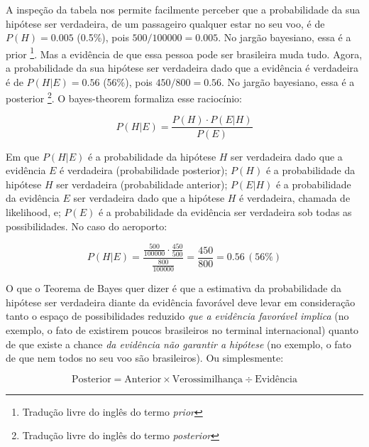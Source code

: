 \documentclass[./main.tex]{subfiles}
\begin{document}
A inspeção da tabela nos permite facilmente perceber que a probabilidade da sua hipótese ser verdadeira, de um passageiro qualquer estar no seu voo, é de $P(H) = 0.005$ (0.5\%), pois $500 / 100000 = 0.005$. No jargão bayesiano, essa é a \gls{prior} \footnote{Tradução livre do inglês do termo \textit{prior}}. Mas a evidência de que essa pessoa pode ser brasileira muda tudo. Agora, a probabilidade da sua hipótese ser verdadeira dado que a evidência é verdadeira é de $P(H | E) = 0.56$ (56\%), pois $450 / 800 = 0.56$. No jargão bayesiano, essa é a \gls{posterior} \footnote{Tradução livre do inglês do termo \textit{posterior}}. O \gls{bayes-theorem} formaliza esse raciocínio:
\begin{linenomath*}
\begin{equation}
\label{eq:bayes}
    P(H | E) = \frac{P(H) \cdot P(E | H)}{P(E)}
\end{equation}
\end{linenomath*}
Em que $P(H | E)$ é a probabilidade da hipótese $H$ ser verdadeira dado que a evidência $E$ é verdadeira (probabilidade posterior); $P(H)$ é a probabilidade da hipótese $H$ ser verdadeira (probabilidade anterior);  $P(E | H)$ é a probabilidade da evidência $E$ ser verdadeira dado que a hipótese $H$ é verdadeira, chamada de \gls{likelihood}, e; $P(E)$ é a probabilidade da evidência ser verdadeira sob todas as possibilidades. No caso do aeroporto:
\begin{linenomath*}
\begin{equation*}
    P(H | E) = \frac{\frac{500}{100000} \cdot \frac{450}{500}}{\frac{800}{100000}} = \frac{450}{800} = 0.56\,(56\%)
\end{equation*}
\end{linenomath*}
O que o Teorema de Bayes quer dizer é que a estimativa da probabilidade da hipótese ser verdadeira diante da evidência favorável deve levar em consideração tanto o espaço de possibilidades reduzido \textit{que a evidência favorável implica} (no exemplo, o fato de existirem poucos brasileiros no terminal internacional) quanto de que existe a chance \textit{da evidência não garantir a hipótese} (no exemplo, o fato de que nem todos no seu voo são brasileiros).  Ou simplesmente:
\begin{linenomath*}
\begin{equation*}
    \text{Posterior} = \text{Anterior} \times \text{Verossimilhança} \div \text{Evidência}
\end{equation*}
\end{linenomath*}
\end{document}

